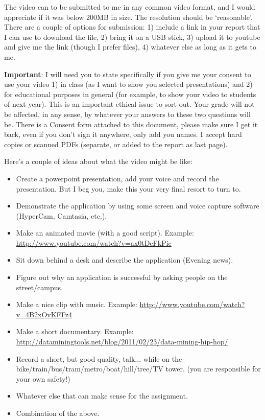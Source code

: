 \documentclass{llncs}
\begin{document}
The video can to be submitted to me in any common video format, and I would appreciate if it was below 200MB in size. The resolution should be `reasonable'. There are a couple of options for submission: 1) include a link in your report that I can use to download the file, 2) bring it on a USB stick, 3) upload it to youtube and give me the link (though I prefer files), 4) whatever else as long as it gets to me.

\textbf{Important}: I will need you to state specifically if you give me your consent to use your video 1) in class (as I want to show you selected presentations) and 2) for educational purposes in general (for example, to show your video to students of next year). This is an important ethical issue to sort out. Your grade will not be affected, in any sense, by whatever your answers to these two questions will be. There is a Consent form attached to this document, please make sure I get it back, even if you don't sign it anywhere, only add you names. I accept hard copies or scanned PDFs (separate, or added to the report as last page).

Here's a couple of ideas about what the video might be like:
\begin{itemize}
	\item Create a powerpoint presentation, add your voice and record the presentation. But I beg you, make this your very final resort to turn to.
	\item Demonstrate the application by using some screen and voice capture software (HyperCam, Camtasia, etc.).
	\item Make an animated movie (with a good script). Example: \url{http://www.youtube.com/watch?v=ax0tDcFkPic}
	\item Sit down behind a desk and describe the application (Evening news).
	\item Figure out why an application is successful by asking people on the street/campus.
	\item Make a nice clip with music. Example: \url{http://www.youtube.com/watch?v=4B2xOvKFFz4}
	\item Make a short documentary. Example: \url{http://dataminingtools.net/blog/2011/02/23/data-mining-hip-hop/}
	\item Record a short, but good quality, talk... while on the bike/train/bus/tram/metro/boat/hill/tree/TV tower. (you are responsible for your own safety!)
	\item Whatever else that can make sense for the assignment.
	\item Combination of the above.
\end{itemize}
\end{document}
